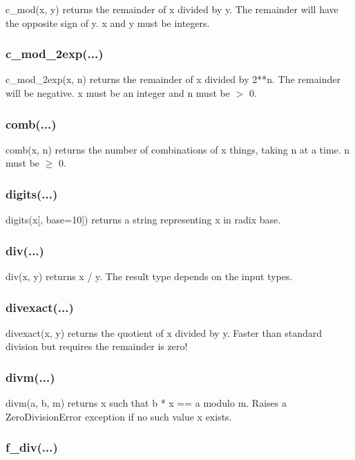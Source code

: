 c\_mod(x, y) returns the remainder of x divided by y. The remainder will have the opposite sign
of y. x and y must be integers.

\subsubsection{c\_mod\_2exp(...)}

c\_mod\_2exp(x, n) returns the remainder of x divided by 2**n. The remainder will be negative. x
must be an integer and n must be $>$ 0.

\subsubsection{comb(...)}

comb(x, n) returns the number of combinations of x things, taking n at a time. n must be $\ge$ 0.

\subsubsection{digits(...)}

digits(x[, base=10]) returns a string representing x in radix base.

\subsubsection{div(...)}

div(x, y) returns x / y. The result type depends on the input types.

\subsubsection{divexact(...)}

divexact(x, y) returns the quotient of x divided by y. Faster than standard division but requires
the remainder is zero!

\subsubsection{divm(...)}

divm(a, b, m) returns x such that b * x == a modulo m. Raises a ZeroDivisionError exception if
no such value x exists.

\subsubsection{f\_div(...)}

